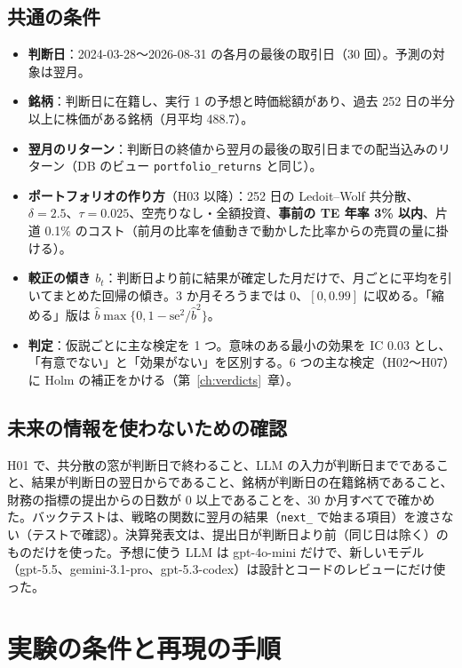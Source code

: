 \documentclass[xelatex,ja=standard,jafont=haranoaji,a4paper,10pt,openany]{bxjsreport}
\newcommand{\code}[1]{\texttt{#1}}
\newcommand{\chapref}[1]{第~\ref{#1}~章}
\begin{document}
\section{共通の条件}

\begin{itemize}
\item \textbf{判断日}：2024-03-28〜2026-08-31 の各月の最後の取引日（30 回）。予測の対象は翌月。
\item \textbf{銘柄}：判断日に在籍し、実行 1 の予想と時価総額があり、過去 252 日の半分以上に株価がある銘柄（月平均 488.7）。
\item \textbf{翌月のリターン}：判断日の終値から翌月の最後の取引日までの配当込みのリターン（DB のビュー \code{portfolio\_returns} と同じ）。
\item \textbf{ポートフォリオの作り方}（H03 以降）：252 日の Ledoit--Wolf 共分散、$\delta=2.5$、$\tau=0.025$、空売りなし・全額投資、\textbf{事前の TE 年率 3\% 以内}、片道 0.1\% のコスト（前月の比率を値動きで動かした比率からの売買の量に掛ける）。
\item \textbf{較正の傾き $b_t$}：判断日より前に結果が確定した月だけで、月ごとに平均を引いてまとめた回帰の傾き。3 か月そろうまでは 0、$[0,0.99]$ に収める。「縮める」版は $\hat b\max\{0,1-\mathrm{se}^2/\hat b^2\}$。
\item \textbf{判定}：仮説ごとに主な検定を 1 つ。意味のある最小の効果を IC 0.03 とし、「有意でない」と「効果がない」を区別する。6 つの主な検定（H02〜H07）に Holm の補正をかける（\chapref{ch:verdicts}）。
\end{itemize}

\section{未来の情報を使わないための確認}

H01 で、共分散の窓が判断日で終わること、LLM の入力が判断日までであること、結果が判断日の翌日からであること、銘柄が判断日の在籍銘柄であること、財務の指標の提出からの日数が 0 以上であることを、30 か月すべてで確かめた。バックテストは、戦略の関数に翌月の結果（\code{next\_} で始まる項目）を渡さない（テストで確認）。決算発表文は、提出日が判断日より前（同じ日は除く）のものだけを使った。予想に使う LLM は gpt-4o-mini だけで、新しいモデル（gpt-5.5、gemini-3.1-pro、gpt-5.3-codex）は設計とコードのレビューにだけ使った。

\chapter{実験の条件と再現の手順}\label{ch:repro}
\end{document}
